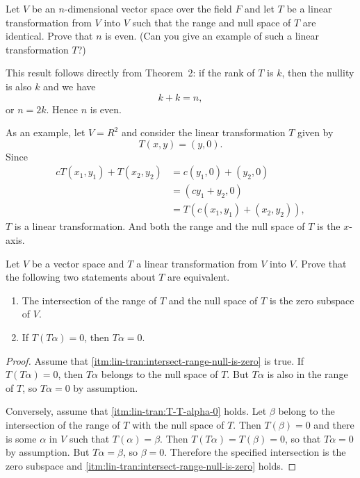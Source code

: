  Let $V$ be an $n$-dimensional vector space over the
field $F$ and let $T$ be a linear transformation from $V$ into $V$
such that the range and null space of $T$ are identical. Prove that
$n$ is even. (Can you give an example of such a linear transformation
$T$?)
\begin{solution}
  This result follows directly from Theorem~2: if the rank of $T$ is
  $k$, then the nullity is also $k$ and we have
  \begin{equation*}
    k + k = n,
  \end{equation*}
  or $n = 2k$. Hence $n$ is even.

  As an example, let $V = R^2$ and consider the linear transformation
  $T$ given by
  \begin{equation*}
    T(x, y) = (y, 0).
  \end{equation*}
  Since
  \begin{align*}
    cT(x_1, y_1) + T(x_2,y_2)
    &= c(y_1, 0) + (y_2, 0) \\
    &= (cy_1 + y_2, 0) \\
    &= T(c(x_1,y_1) + (x_2,y_2)),
  \end{align*}
  $T$ is a linear transformation. And both the range and the null
  space of $T$ is the $x$-axis.
\end{solution}

 Let $V$ be a vector space and $T$ a linear
transformation from $V$ into $V$. Prove that the following two
statements about $T$ are equivalent.
\begin{enumerate}
\item
  \label{itm:lin-tran:intersect-range-null-is-zero}
  The intersection of the range of $T$ and the null space of $T$ is
  the zero subspace of $V$.
\item
  \label{itm:lin-tran:T-T-alpha-0}
  If $T(T\alpha) = 0$, then $T\alpha = 0$.
\end{enumerate}
\begin{proof}
  Assume that \ref{itm:lin-tran:intersect-range-null-is-zero} is
  true. If $T(T\alpha) = 0$, then $T\alpha$ belongs to the null space
  of $T$. But $T\alpha$ is also in the range of $T$, so $T\alpha = 0$
  by assumption.

  Conversely, assume that \ref{itm:lin-tran:T-T-alpha-0} holds. Let
  $\beta$ belong to the intersection of the range of $T$ with the null
  space of $T$. Then $T(\beta) = 0$ and there is some $\alpha$ in $V$
  such that $T(\alpha) = \beta$. Then $T(T\alpha) = T(\beta) = 0$, so
  that $T\alpha = 0$ by assumption. But $T\alpha = \beta$, so
  $\beta = 0$. Therefore the specified intersection is the zero
  subspace and \ref{itm:lin-tran:intersect-range-null-is-zero} holds.
\end{proof}

